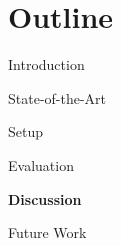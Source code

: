 \section{Outline}
\begin{frame}{}
    \vspace{1.5cm}
    \begin{itemize}
        \setlength\itemsep{2em}
        
        {\color{TUMBlack} 
            \item \large Introduction
            \item \large State-of-the-Art
            \item \large Setup
            \item \large Evaluation
        }
        \item \large \textbf{Discussion}
        \item \large Future Work
    \end{itemize}
\end{frame}